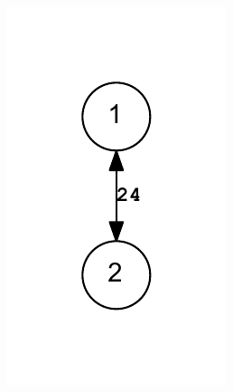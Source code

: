 \documentclass[letterpaper,12pt]{article}
\begin{document}
\begin{figure}
\includegraphics{out.reduced.collapsed.bidigraph.pdf}
\end{figure}
\end{document}
